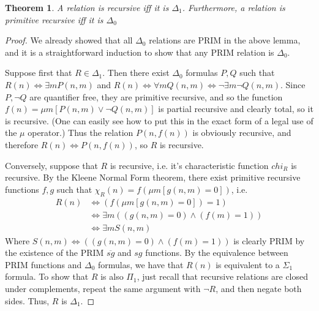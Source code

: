 \documentclass{article}
\theoremstyle{definition}
\theoremstyle{plain}
\theoremstyle{theorem}
\newtheorem{theorem}{Theorem}[section]
\begin{document}
\begin{theorem}
    A relation is recursive iff it is $\Delta_1$. Furthermore, a relation is primitive recursive iff it is $\Delta_0$
\end{theorem}
\begin{proof}
    \par We already showed that all $\Delta_0$ relations are PRIM in the above lemma, and it is a straightforward induction to show that any PRIM relation is $\Delta_0$.
    \par Suppose first that $R \in \Delta_1$. Then there exist $\Delta_0$ formulas $P,Q$ such that $R(n) \iff \exists m P(n,m)$ and $R(n) \iff \forall m Q(n,m) \iff \neg \exists m \neg Q(n,m)$. Since $P,\neg Q$ are quantifier free, they are primitive recursive, and so the function $f(n) = \mu m [P(n,m) \vee \neg Q(n,m)]$ is partial recursive and clearly total, so it is recursive. (One can easily see how to put this in the exact form of a legal use of the $\mu$ operator.) Thus the relation $P(n,f(n))$ is obviously recursive, and therefore $R(n) \iff P(n,f(n))$, so $R$ is recursive.
    \par Conversely, suppose that $R$ is recursive, i.e. it's characteristic function $chi_R$ is recursive. By the Kleene Normal Form theorem, there exist primitive recursive functions $f,g$ such that $\chi_R(n) = f(\mu m [g(n,m)=0])$, i.e.
    \begin{align}
        R(n) &\iff (f(\mu m [g(n,m)=0]) = 1) \\
             &\iff \exists m ((g(n,m) = 0) \wedge (f(m) = 1)) \\
             &\iff \exists m S(n,m)
    \end{align}
    Where $S(n,m) \iff ((g(n,m) = 0) \wedge (f(m) = 1))$ is clearly PRIM by the existence of the PRIM $\overline{sg}$ and $sg$ functions. By the equivalence between PRIM functions and $\Delta_0$ formulas, we have that $R(n)$ is equivalent to a $\Sigma_1$ formula. To show that $R$ is also $\Pi_1$, just recall that recursive relations are closed under complements, repeat the same argument with $\neg R$, and then negate both sides. Thus, $R$ is $\Delta_1$.
\end{proof}
\end{document}
